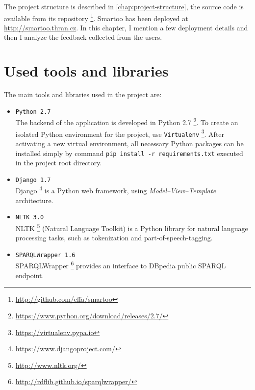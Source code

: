 \documentclass[12pt, twoside]{fithesis2}
\renewcommand{\_}{\leavevmode \kern0.07em\vbox{\hrule width0.4em}}
\newcommand{\squarebullet}{\textcolor{black}{\raisebox{0.15em}{\rule{4pt}{4pt}}}}
\newcommand{\emptysquarebullet}{\textcolor{black}{\raisebox{0.10em}{\tiny$\square$}}}
\newenvironment{myItemize}{
  \begin{itemize}[leftmargin=2em,rightmargin=1em,itemsep=\parskip ,parsep=0em,topsep=0em,partopsep=0em]
  \renewcommand{\labelitemi}{\squarebullet}
  \renewcommand{\labelitemii}{\textbullet}
}{
  \end{itemize}
}
\begin{document}
The project structure is described in \autoref{chap:project-structure},
the source code is available from its repository%
\footnote{\url{http://github.com/effa/smartoo}}.
Smartoo has been deployed at \url{http://smartoo.thran.cz}.
In this chapter, I mention a few deployment details
and then I analyze the feedback collected from the users.

\section{Used tools and libraries}
\label{sec:tools}

The main tools and libraries used in the project are:
\begin{myItemize}
\item \texttt{Python 2.7}\\
The backend of the application is developed in Python 2.7%
\footnote{\url{https://www.python.org/download/releases/2.7/}}.
To create an isolated Python environment for the project, use \texttt{Virtualenv}%
\footnote{\url{https://virtualenv.pypa.io}}.
After activating a new virtual environment, all necessary Python packages can be installed simply by
command \texttt{pip install -r requirements.txt} executed in the project root directory.

\item \texttt{Django 1.7}\\
Django%
\footnote{\url{https://www.djangoproject.com/}}
is a Python web framework, using \emph{Model--View--Template} architecture.


\item \texttt{NLTK 3.0}\\
NLTK%
\footnote{\url{http://www.nltk.org/}}
(Natural Language Toolkit) is a Python library for natural language processing tasks,
such as tokenization and part-of-speech-tagging.

\item \texttt{SPARQLWrapper 1.6}\\
SPARQLWrapper%
\footnote{\url{http://rdflib.github.io/sparqlwrapper/}}
provides an interface to DBpedia public SPARQL endpoint.


\end{myItemize}
\end{document}
